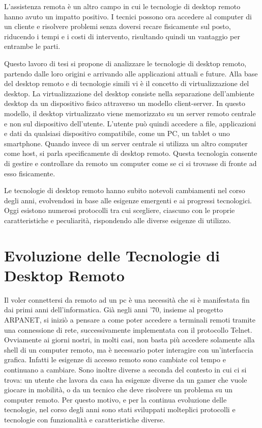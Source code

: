 \documentclass[12pt,a4paper,openright,twoside]{book}
\begin{document}
L'assistenza remota è un altro campo in cui le tecnologie di desktop remoto hanno avuto un impatto positivo. I tecnici possono ora accedere al computer di un cliente e risolvere problemi senza doversi recare fisicamente sul posto, riducendo i tempi e i costi di intervento, risultando quindi un vantaggio per entrambe le parti.

Questo lavoro di tesi si propone di analizzare le tecnologie di desktop remoto, partendo dalle loro origini e arrivando alle applicazioni attuali e future. Alla base del desktop remoto e di tecnologie simili vi è il concetto di virtualizzazione del desktop. La virtualizzazione del desktop consiste nella separazione dell'ambiente desktop da un dispositivo fisico attraverso un modello client-server. In questo modello, il desktop virtualizzato viene memorizzato su un server remoto centrale e non sul dispositivo dell'utente. L'utente può quindi accedere a file, applicazioni e dati da qualsiasi dispositivo compatibile, come un PC, un tablet o uno smartphone. %
Quando invece di un server centrale si utilizza un altro computer come host, si parla specificamente di desktop remoto. Questa tecnologia consente di gestire e controllare da remoto un computer come se ci si trovasse di fronte ad esso fisicamente.

Le tecnologie di desktop remoto hanno subito notevoli cambiamenti nel corso degli anni, evolvendosi in base alle esigenze emergenti e ai progressi tecnologici. Oggi esistono numerosi protocolli tra cui scegliere, ciascuno con le proprie caratteristiche e peculiarità, rispondendo alle diverse esigenze di utilizzo.



\chapter{Evoluzione delle Tecnologie di Desktop Remoto}
\label{chap:evolution}
Il voler connettersi da remoto ad un pc è una necessità che si è manifestata fin dai primi anni dell'informatica. Già negli anni '70, insieme al progetto ARPANET, si iniziò a pensare a come poter accedere a terminali remoti tramite una connessione di rete, successivamente implementata con il protocollo Telnet. 
Ovviamente ai giorni nostri, in molti casi, non basta più accedere solamente alla shell di un computer remoto, ma è necessario poter interagire con un'interfaccia grafica. Infatti le esigenze di accesso remoto sono cambiate col tempo e continuano a cambiare. Sono inoltre diverse a seconda del contesto in cui ci si trova: un utente che lavora da casa ha esigenze diverse da un gamer che vuole giocare in mobilità, o da un tecnico che deve risolvere un problema su un computer remoto. Per questo motivo, e per la continua evoluzione delle tecnologie, nel corso degli anni sono stati sviluppati molteplici protocolli e tecnologie con funzionalità e caratteristiche diverse.
\end{document}
